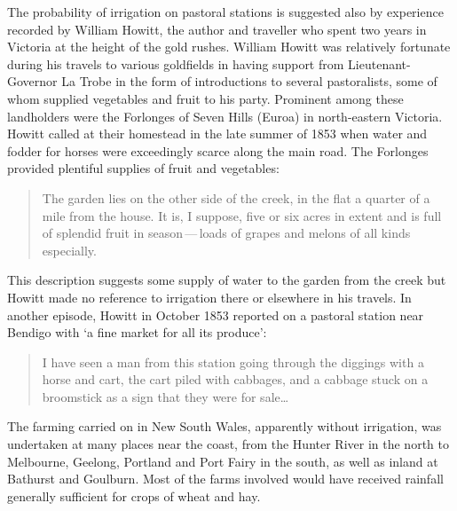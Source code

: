 The probability of irrigation on pastoral stations is suggested also
by experience recorded by William Howitt, the author and traveller who
spent two years in Victoria at the height of the gold rushes.  William
Howitt  was relatively fortunate during his travels
to various goldfields in having support from Lieutenant-Governor La
Trobe  in the form of introductions to
several pastoralists, some of whom supplied vegetables and fruit to
his party.  Prominent among these landholders were the Forlonges
 of
Seven Hills  (Euroa)  in
north-eastern Victoria.  Howitt called at their homestead in the late
summer of 1853 when water and fodder for horses were exceedingly
scarce along the main road.  The Forlonges provided plentiful supplies
of fruit and vegetables:
\begin{quote}
	The garden lies on the other side of the creek, in the flat a
	quarter of a mile from the house. It is, I suppose, five or
	six acres in extent and is full of splendid fruit in
	season\,---\,loads of grapes and melons of all kinds
	especially.
\end{quote}

This description suggests some supply of water to the garden from the
creek but Howitt made no reference to irrigation there or elsewhere in
his travels.  In another episode, Howitt in October 1853 reported on a
pastoral station near Bendigo with `a fine market for all its
produce':
\begin{quote}
	I have seen a man from this station going through the diggings
	with a horse and cart, the cart piled with cabbages, and a
	cabbage stuck on a broomstick as a sign that they were for
	sale\ldots{}
\end{quote}

The farming carried on in New South Wales, apparently without
irrigation, was undertaken at many places near the coast, from the
Hunter River  in the north to Melbourne,
 Geelong,  
Portland  and Port Fairy
 in the south, as well as inland at Bathurst
 and
Goulburn.  Most of the farms involved would have
received rainfall generally sufficient for crops of wheat and hay.

